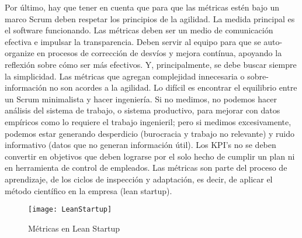 Por último, hay que tener en cuenta que para que las métricas estén bajo un marco Scrum deben respetar los principios de la agilidad. La medida principal es el software funcionando. Las métricas deben ser un medio de comunicación efectiva e impulsar la transparencia. Deben servir al equipo para que se auto-organize en procesos de corrección de desvíos y mejora contínua, apoyando la reflexión sobre cómo ser más efectivos. Y, principalmente, se debe buscar siempre la simplicidad. Las métricas que agregan complejidad innecesaria o sobre-información no son acordes a la agilidad. Lo difícil es encontrar el equilibrio entre un Scrum minimalista y hacer ingeniería. Si no medimos, no podemos hacer análisis del sistema de trabajo, o sistema productivo, para mejorar con datos empíricos como lo requiere el trabajo ingenieril; pero si medimos excesivamente, podemos estar generando desperdicio (burocracia y trabajo no relevante) y ruido informativo (datos que no generan información útil). Los KPI's no se deben convertir en objetivos que deben lograrse por el solo hecho de cumplir un plan ni en herramienta de control de empleados. Las métricas son parte del proceso de aprendizaje, de los ciclos de inspección y adaptación, es decir, de aplicar el método científico en la empresa (lean startup).

\begin{figure}[h]
  \centering
  \texttt{[image: LeanStartup]}
  \caption{Métricas en Lean Startup}
  \centering
  \label{fig:LeanStartup} %
\end{figure}
\FloatBarrier %

